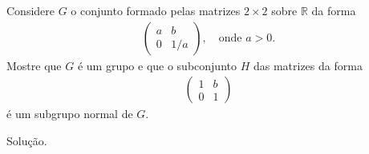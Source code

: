 \begin{homeworkProblem}
  Considere $G$ o conjunto formado pelas matrizes $2 \times 2$ sobre $\mathbb{R}$ da forma
  \begin{align*}
    \begin{pmatrix}
      a & b \\
      0 & 1/a
    \end{pmatrix},\quad \text{onde } a > 0.
  \end{align*}
  Mostre que $G$ é um grupo e que o subconjunto $H$ das matrizes da forma
  \begin{align*}
    \begin{pmatrix}
      1 & b \\
      0 & 1
    \end{pmatrix}
  \end{align*}
  é um subgrupo normal de $G$.
  \begin{solution}
    Solução.
  \end{solution}
\end{homeworkProblem}
